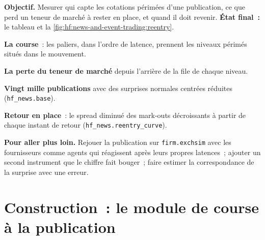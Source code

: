 \begin{tutorial}
\textbf{Objectif.} Mesurer qui capte les cotations périmées d'une publication, ce que perd un teneur de marché à rester en place, et quand il doit revenir.
\textbf{État final~:} le tableau et la \cref{fig:hf:news-and-event-trading:reentry}.
\begin{tutsteps}
\item \textbf{La course}~: les paliers, dans l'ordre de latence, prennent les niveaux périmés situés dans le mouvement.
\label{lst:hf:news-and-event-trading:race}
\item \textbf{La perte du teneur de marché} depuis l'arrière de la file de chaque niveau.
\label{lst:hf:news-and-event-trading:mmloss}
\item \textbf{Vingt mille publications} avec des surprises normales centrées réduites (\texttt{hf\_news.base}).
\item \textbf{Retour en place}~: le spread diminué des mark-outs décroissants à partir de chaque instant de retour (\texttt{hf\_news.reentry\_curve}).
\end{tutsteps}
\textbf{Pour aller plus loin.} Rejouer la publication sur \texttt{firm.exchsim} avec les fournisseurs comme agents qui réagissent après leurs propres latences~;
ajouter un second instrument que le chiffre fait bouger~; faire estimer la correspondance de la surprise avec une erreur.
\end{tutorial}

\section{Construction~: le module de course à la publication}\label{bld:hf:news-and-event-trading:newsrace}

